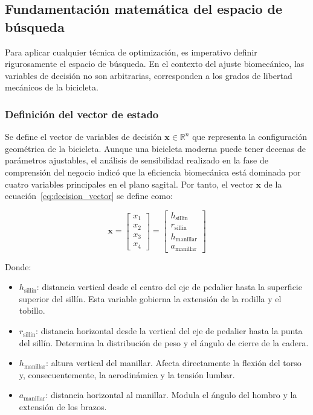 \subsection{Fundamentación matemática del espacio de búsqueda}

Para aplicar cualquier técnica de optimización, es imperativo definir
rigurosamente el espacio de búsqueda. En el contexto del ajuste biomecánico,
las variables de decisión no son arbitrarias, corresponden a los grados de
libertad mecánicos de la bicicleta.

\subsubsection{Definición del vector de estado}

Se define el vector de variables de decisión $\mathbf{x} \in \mathbb{R}^{n}$ que
representa la configuración geométrica de la bicicleta. Aunque una bicicleta
moderna puede tener decenas de parámetros ajustables, el análisis de
sensibilidad realizado en la fase de comprensión del negocio indicó que la
eficiencia biomecánica está dominada por cuatro variables principales en el
plano sagital. Por tanto, el vector $\mathbf{x}$ de la ecuación~\ref{eq:decision_vector} se define como:

\begin{equation}
  \label{eq:decision_vector}
  \mathbf{x} = \begin{bmatrix} x_1 \\ x_2 \\ x_3 \\ x_4 \end{bmatrix} = \begin{bmatrix} h_{\text{sillin}} \\ r_{\text{sillin}} \\ h_{\text{manillar}} \\ a_{\text{manillar}} \end{bmatrix}
\end{equation}

Donde:
\begin{itemize}
  \item $h_{\text{sillin}}$: distancia vertical desde el centro del eje de pedalier hasta la superficie superior del sillín. Esta variable gobierna la extensión de la rodilla y el tobillo.
  \item $r_{\text{sillin}}$: distancia horizontal desde la vertical del eje de pedalier hasta la punta del sillín. Determina la distribución de peso y el ángulo de cierre de la cadera.
  \item $h_{\text{manillar}}$: altura vertical del manillar. Afecta directamente la flexión del torso y, consecuentemente, la aerodinámica y la tensión lumbar.
  \item $a_{\text{manillar}}$: distancia horizontal al manillar. Modula el ángulo del hombro y la extensión de los brazos.
\end{itemize}

